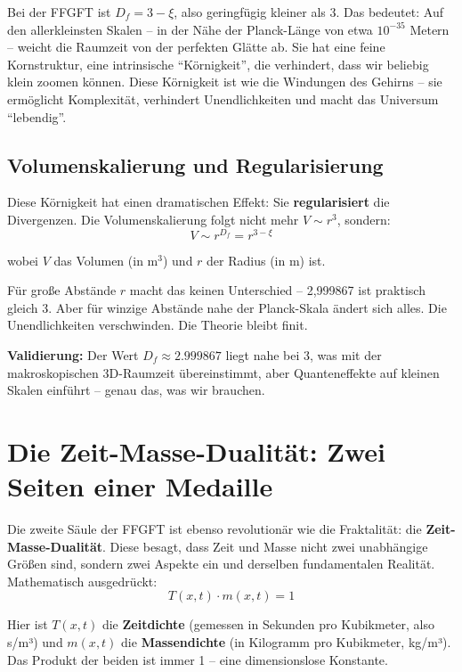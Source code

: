 Bei der FFGFT ist $D_f = 3 - \xi$, also geringfügig kleiner als 3. Das bedeutet: Auf den allerkleinsten Skalen – in der Nähe der Planck-Länge von etwa $10^{-35}$ Metern – weicht die Raumzeit von der perfekten Glätte ab. Sie hat eine feine Kornstruktur, eine intrinsische \enquote{Körnigkeit}, die verhindert, dass wir beliebig klein zoomen können. Diese Körnigkeit ist wie die Windungen des Gehirns – sie ermöglicht Komplexität, verhindert Unendlichkeiten und macht das Universum \enquote{lebendig}.

\subsection{Volumenskalierung und Regularisierung}

Diese Körnigkeit hat einen dramatischen Effekt: Sie \textbf{regularisiert} die Divergenzen. Die Volumenskalierung folgt nicht mehr $V \sim r^3$, sondern:
\begin{equation}
V \sim r^{D_f} = r^{3-\xi}
\end{equation}

wobei $V$ das Volumen (in $\text{m}^3$) und $r$ der Radius (in m) ist.

Für große Abstände $r$ macht das keinen Unterschied – 2,999867 ist praktisch gleich 3. Aber für winzige Abstände nahe der Planck-Skala ändert sich alles. Die Unendlichkeiten verschwinden. Die Theorie bleibt finit.

\textbf{Validierung:} Der Wert $D_f \approx 2.999867$ liegt nahe bei 3, was mit der makroskopischen 3D-Raumzeit übereinstimmt, aber Quanteneffekte auf kleinen Skalen einführt – genau das, was wir brauchen.

\section{Die Zeit-Masse-Dualität: Zwei Seiten einer Medaille}

Die zweite Säule der FFGFT ist ebenso revolutionär wie die Fraktalität: die \textbf{Zeit-Masse-Dualität}. Diese besagt, dass Zeit und Masse nicht zwei unabhängige Größen sind, sondern zwei Aspekte ein und derselben fundamentalen Realität. Mathematisch ausgedrückt:
\begin{equation}
T(x,t) \cdot m(x,t) = 1
\end{equation}

Hier ist $T(x,t)$ die \textbf{Zeitdichte} (gemessen in Sekunden pro Kubikmeter, also s/m³) und $m(x,t)$ die \textbf{Massendichte} (in Kilogramm pro Kubikmeter, kg/m³). Das Produkt der beiden ist immer 1 – eine dimensionslose Konstante.

